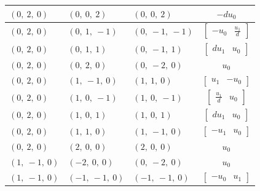 \documentclass[11pt]{article}
\theoremstyle{definition}
\begin{document}
\begin{longtable}{|l|l|l|c|}
    \hline
    $\left( 0, \  2, \  0\right)$ & $\left( 0, \  0, \  2\right)$ & $\left( 0, \  0, \  2\right)$ & $- d u_{0}$ \\
    \hline
    $\left( 0, \  2, \  0\right)$ & $\left( 0, \  1, \  -1\right)$ & $\left( 0, \  -1, \  -1\right)$ & $\left[\begin{matrix}- u_{0} & \frac{u_{1}}{d}\end{matrix}\right]$ \\
    \hline
    $\left( 0, \  2, \  0\right)$ & $\left( 0, \  1, \  1\right)$ & $\left( 0, \  -1, \  1\right)$ & $\left[\begin{matrix}d u_{1} & u_{0}\end{matrix}\right]$ \\
    \hline
    $\left( 0, \  2, \  0\right)$ & $\left( 0, \  2, \  0\right)$ & $\left( 0, \  -2, \  0\right)$ & $u_{0}$ \\
    \hline
    $\left( 0, \  2, \  0\right)$ & $\left( 1, \  -1, \  0\right)$ & $\left( 1, \  1, \  0\right)$ & $\left[\begin{matrix}u_{1} & - u_{0}\end{matrix}\right]$ \\
    \hline
    $\left( 0, \  2, \  0\right)$ & $\left( 1, \  0, \  -1\right)$ & $\left( 1, \  0, \  -1\right)$ & $\left[\begin{matrix}\frac{u_{1}}{d} & u_{0}\end{matrix}\right]$ \\
    \hline
    $\left( 0, \  2, \  0\right)$ & $\left( 1, \  0, \  1\right)$ & $\left( 1, \  0, \  1\right)$ & $\left[\begin{matrix}d u_{1} & u_{0}\end{matrix}\right]$ \\
    \hline
    $\left( 0, \  2, \  0\right)$ & $\left( 1, \  1, \  0\right)$ & $\left( 1, \  -1, \  0\right)$ & $\left[\begin{matrix}- u_{1} & u_{0}\end{matrix}\right]$ \\
    \hline
    $\left( 0, \  2, \  0\right)$ & $\left( 2, \  0, \  0\right)$ & $\left( 2, \  0, \  0\right)$ & $u_{0}$ \\
    \hline
    $\left( 1, \  -1, \  0\right)$ & $\left( -2, \  0, \  0\right)$ & $\left( 0, \  -2, \  0\right)$ & $u_{0}$ \\
    \hline
    $\left( 1, \  -1, \  0\right)$ & $\left( -1, \  -1, \  0\right)$ & $\left( -1, \  -1, \  0\right)$ & $\left[\begin{matrix}- u_{0} & u_{1}\end{matrix}\right]$ \\

\end{longtable}
\end{document}
